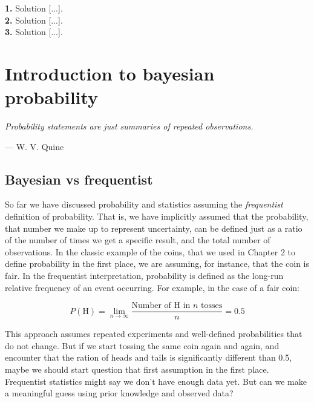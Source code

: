 \documentclass{book}
\begin{document}
\textbf{1.} Solution [...].\\

\textbf{2.} Solution [...].\\

\textbf{3.} Solution [...].\\



\chapter{Introduction to bayesian probability}

\epigraph{\textit{Probability statements are just summaries of repeated observations.}}{— W. V. Quine}

\section{Bayesian vs frequentist}

So far we have discussed probability and statistics assuming the \textit{frequentist} definition of probability. That is, we have implicitly assumed that the probability, that number we make up to represent uncertainty, can be defined just as a ratio of the number of times we get a specific result, and the total number of observations. In the classic example of the coins, that we used in Chapter 2 to define probability in the first place, we are assuming, for instance, that the coin is fair. In the frequentist interpretation, probability is defined as the long-run relative frequency of an event occurring. For example, in the case of a fair coin:

\[
P(\text{H}) = \lim_{n \to \infty} \frac{\text{Number of H in } n \text{ tosses}}{n} = 0.5
\]

This approach assumes repeated experiments and well-defined probabilities that do not change. But if we start tossing the same coin again and again, and encounter that the ration of heads and tails is significantly different than 0.5, maybe we should start question that first assumption in the first place. Frequentist statistics might say we don't have enough data yet. But can we make a meaningful guess using prior knowledge and observed data? \\
\end{document}
